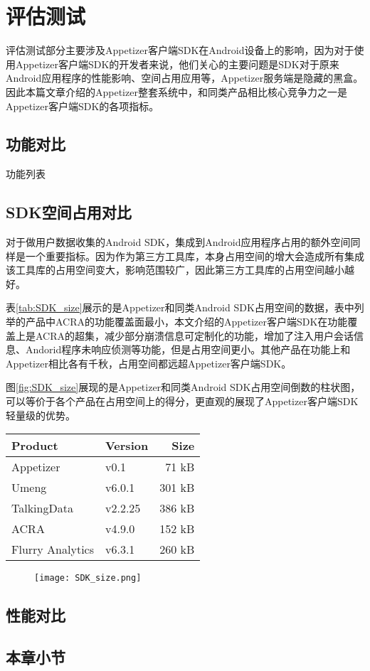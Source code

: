 
\chapter{评估测试}
\label{chap:evaluation}

评估测试部分主要涉及Appetizer客户端SDK在Android设备上的影响，因为对于使用Appetizer客户端SDK的开发者来说，他们关心的主要问题是SDK对于原来Android应用程序的性能影响、空间占用应用等，Appetizer服务端是隐藏的黑盒。
因此本篇文章介绍的Appetizer整套系统中，和同类产品相比核心竞争力之一是Appetizer客户端SDK的各项指标。

\section{功能对比}

功能列表


\section{SDK空间占用对比}

对于做用户数据收集的Android SDK，集成到Android应用程序占用的额外空间同样是一个重要指标。因为作为第三方工具库，本身占用空间的增大会造成所有集成该工具库的占用空间变大，影响范围较广，因此第三方工具库的占用空间越小越好。

表\ref{tab:SDK_size}展示的是Appetizer和同类Android SDK占用空间的数据，表中列举的产品中ACRA的功能覆盖面最小，本文介绍的Appetizer客户端SDK在功能覆盖上是ACRA的超集，减少部分崩溃信息可定制化的功能，增加了注入用户会话信息、Andorid程序未响应侦测等功能，但是占用空间更小。其他产品在功能上和Appetizer相比各有千秋，占用空间都远超Appetizer客户端SDK。

图\ref{fig:SDK_size}展现的是Appetizer和同类Android SDK占用空间倒数的柱状图，可以等价于各个产品在占用空间上的得分，更直观的展现了Appetizer客户端SDK轻量级的优势。

\begin{table}[!hpb]
	\centering
	\begin{tabular}{@{}llr@{}} \toprule
		Product & Version &Size \\ \midrule
		Appetizer &v0.1& 71 kB \\
		Umeng&v6.0.1& 301 kB \\
		TalkingData&v2.2.25& 386 kB \\
		ACRA&v4.9.0& 152 kB \\
		Flurry Analytics&v6.3.1& 260 kB \\ \bottomrule
	\end{tabular}
\end{table}

\begin{figure}[!htp]
	\centering
	\texttt{[image: SDK\_size.png]}
\end{figure}

\section{性能对比}





\section{本章小节}

